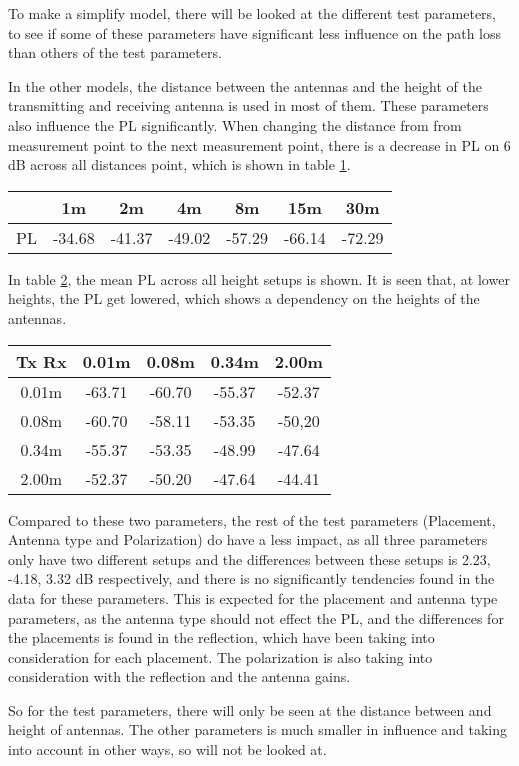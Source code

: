 To make a simplify model, there will be looked at the different test parameters, to see if some of these parameters have significant less influence on the path loss than others of the test parameters.

In the other models, the distance between the antennas and the height of the transmitting and receiving antenna is used in most of them. These parameters also influence the PL significantly. When changing the distance from from measurement point to the next measurement point, there is a decrease in PL on 6 dB across all distances point, which is shown in table \ref{App1}.

\begin{table}

\begin{tabular}{|c|c|c|c|c|c|c|}
\hline
   & 1m & 2m & 4m & 8m & 15m & 30m\\
\hline
PL & -34.68 & -41.37 & -49.02 & -57.29 & -66.14 & -72.29 \\
\hline

\end{tabular}
\label{App1}
\end{table}

In table \ref{App2}, the mean PL across all height setups is shown. It is seen that, at lower heights, the PL get lowered, which shows a dependency on the heights of the antennas.

\begin{table}
\begin{tabular}{|c|c|c|c|c|}
\hline
Tx Rx & 0.01m & 0.08m & 0.34m & 2.00m \\
\hline
0.01m & -63.71 & -60.70 & -55.37 & -52.37\\
\hline
0.08m & -60.70 & -58.11 & -53.35 & -50,20\\
\hline
0.34m & -55.37 & -53.35 & -48.99 & -47.64\\
\hline
2.00m & -52.37 & -50.20 & -47.64 & -44.41\\
\hline
\end{tabular}
\label{App2}
\end{table}

Compared to these two parameters, the rest of the test parameters (Placement, Antenna type and Polarization) do have a less impact, as all three parameters only have two different setups and the differences between these setups is 2.23, -4.18, 3.32 dB respectively, and there is no significantly tendencies found in the data for these parameters. This is expected for the placement and antenna type parameters, as the antenna type should not effect the PL, and the differences for the placements is found in the reflection, which have been taking into consideration for each placement. The polarization is also taking into consideration with the reflection and the antenna gains.

So for the test parameters, there will only be seen at the distance between and height of antennas. The other parameters is much smaller in influence and taking into account in other ways, so will not be looked at.
